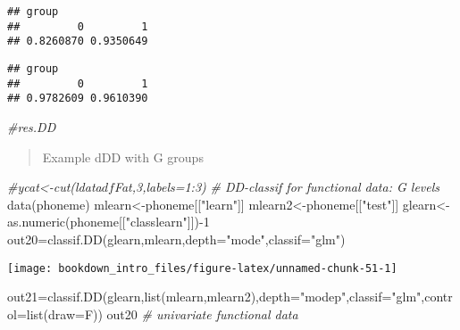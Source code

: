 \documentclass[
]{book}
\newenvironment{Shaded}{\begin{snugshade}}{\end{snugshade}}
\newcommand{\AttributeTok}[1]{\textcolor[rgb]{0.77,0.63,0.00}{#1}}
\newcommand{\CommentTok}[1]{\textcolor[rgb]{0.56,0.35,0.01}{\textit{#1}}}
\newcommand{\DecValTok}[1]{\textcolor[rgb]{0.00,0.00,0.81}{#1}}
\newcommand{\FunctionTok}[1]{\textcolor[rgb]{0.00,0.00,0.00}{#1}}
\newcommand{\NormalTok}[1]{#1}
\newcommand{\OtherTok}[1]{\textcolor[rgb]{0.56,0.35,0.01}{#1}}
\newcommand{\SpecialCharTok}[1]{\textcolor[rgb]{0.00,0.00,0.00}{#1}}
\newcommand{\StringTok}[1]{\textcolor[rgb]{0.31,0.60,0.02}{#1}}
\begin{document}
\begin{verbatim}
## group
##         0         1 
## 0.8260870 0.9350649
\end{verbatim}

\begin{Shaded}
\end{Shaded}

\begin{verbatim}
## group
##         0         1 
## 0.9782609 0.9610390
\end{verbatim}

\begin{Shaded}
\begin{Highlighting}[]
\CommentTok{\#res.DD}
\end{Highlighting}
\end{Shaded}

\begin{quote}
Example dDD with G groups
\end{quote}

\begin{Shaded}
\begin{Highlighting}[]
\CommentTok{\#ycat\textless{}{-}cut(ldata$df$Fat,3,labels=1:3) }
\CommentTok{\# DD{-}classif for functional data: G levels }
\FunctionTok{data}\NormalTok{(phoneme)}
\NormalTok{mlearn}\OtherTok{\textless{}{-}}\NormalTok{phoneme[[}\StringTok{"learn"}\NormalTok{]]}
\NormalTok{mlearn2}\OtherTok{\textless{}{-}}\NormalTok{phoneme[[}\StringTok{"test"}\NormalTok{]]}
\NormalTok{glearn}\OtherTok{\textless{}{-}}\FunctionTok{as.numeric}\NormalTok{(phoneme[[}\StringTok{"classlearn"}\NormalTok{]])}\SpecialCharTok{{-}}\DecValTok{1}
\NormalTok{out20}\OtherTok{=}\FunctionTok{classif.DD}\NormalTok{(glearn,mlearn,}\AttributeTok{depth=}\StringTok{"mode"}\NormalTok{,}\AttributeTok{classif=}\StringTok{"glm"}\NormalTok{)}
\end{Highlighting}
\end{Shaded}

\begin{center}\texttt{[image: bookdown\_intro\_files/figure-latex/unnamed-chunk-51-1]} \end{center}

\begin{Shaded}
\begin{Highlighting}[]
\NormalTok{out21}\OtherTok{=}\FunctionTok{classif.DD}\NormalTok{(glearn,}\FunctionTok{list}\NormalTok{(mlearn,mlearn2),}\AttributeTok{depth=}\StringTok{"modep"}\NormalTok{,}\AttributeTok{classif=}\StringTok{"glm"}\NormalTok{,}\AttributeTok{control=}\FunctionTok{list}\NormalTok{(}\AttributeTok{draw=}\NormalTok{F))}
\NormalTok{out20 }\CommentTok{\# univariate functional data}
\end{Highlighting}
\end{Shaded}
\end{document}
